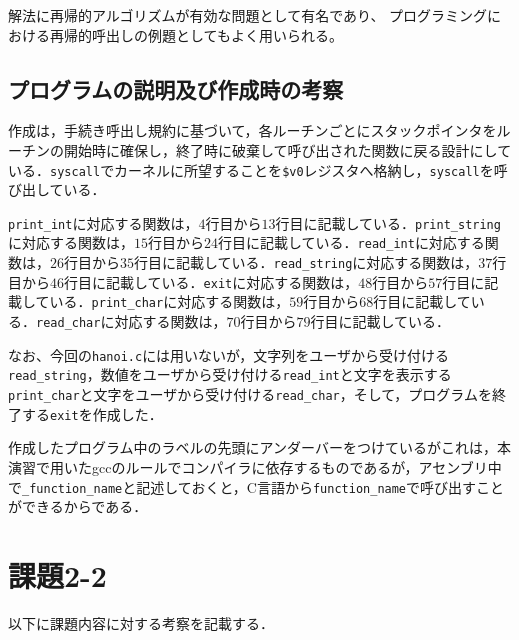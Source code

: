 \documentclass[a4j,11pt]{jarticle}
\begin{document}
解法に再帰的アルゴリズムが有効な問題として有名であり、
プログラミングにおける再帰的呼出しの例題としてもよく用いられる。
  \subsection{プログラムの説明及び作成時の考察}
作成は，手続き呼出し規約に基づいて，各ルーチンごとにスタックポインタをルーチンの開始時に確保し，終了時に破棄して呼び出された関数に戻る設計にしている．\verb|syscall|でカーネルに所望することを\verb|$v0|レジスタへ格納し，\verb|syscall|を呼び出している．

\verb|print_int|に対応する関数は，$4$行目から$13$行目に記載している．\verb|print_string|に対応する関数は，$15$行目から$24$行目に記載している．\verb|read_int|に対応する関数は，$26$行目から$35$行目に記載している．\verb|read_string|に対応する関数は，$37$行目から$46$行目に記載している．\verb|exit|に対応する関数は，$48$行目から$57$行目に記載している．\verb|print_char|に対応する関数は，$59$行目から$68$行目に記載している．\verb|read_char|に対応する関数は，$70$行目から$79$行目に記載している．

なお、今回の\verb|hanoi.c|には用いないが，文字列をユーザから受け付ける\verb|read_string|，数値をユーザから受け付ける\verb|read_int|と文字を表示する\verb|print_char|と文字をユーザから受け付ける\verb|read_char|，そして，プログラムを終了する\verb|exit|を作成した．
  
作成したプログラム中のラベルの先頭にアンダーバーをつけているがこれは，本演習で用いたgccのルールでコンパイラに依存するものであるが，アセンブリ中で\verb|_function_name|と記述しておくと，C言語から\verb|function_name|で呼び出すことができるからである．

 \section{課題2-2}
以下に課題内容に対する考察を記載する．
\end{document}
